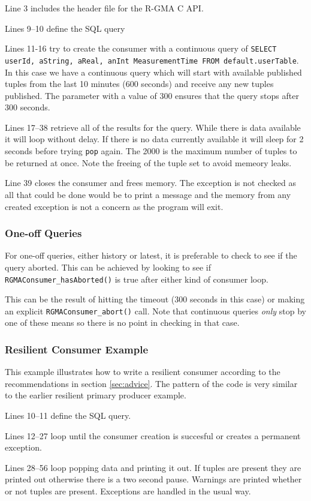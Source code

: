 Line 3 includes the header file for the R-GMA C API.

Lines 9--10 define the SQL query

Lines 11-16 try to create the consumer with a continuous query of \texttt{SELECT
userId, aString, aReal, anInt MeasurementTime FROM default.userTable}. In this case we have a
continuous query which will start with available published tuples from
the last 10 minutes (600 seconds) and receive any new tuples published. The
parameter with a value of 300 ensures that the query stops after 300 seconds.

Lines 17--38  retrieve all of the results for the query. While there is
data available it will loop without delay. If there is no data
currently available it will sleep for 2 seconds before trying
\texttt{pop} again. The 2000 is the maximum number of tuples to be
returned at once. Note the freeing of the tuple set to avoid memeory leaks.

Line 39 closes the consumer and frees memory. The exception is not checked as all
that could be done would be to print a message and the memory from any created
exception is not a concern as the program will exit.

\subsubsection {One-off Queries}
For one-off queries, either history or latest, it is preferable to
check to see if the query aborted. This can be achieved by looking to
see if \texttt{RGMAConsumer\_hasAborted()} is true after either kind of
consumer loop.

This can be the result of hitting the timeout (300 seconds in this
case) or making an explicit \texttt{RGMAConsumer\_abort()} call. Note that
continuous queries \emph{only} stop by one of these means so there is
no point in checking in that case.

\subsubsection{Resilient Consumer Example}
This example illustrates how to write a resilient consumer according
to the recommendations in section \ref{sec:advice}.
The pattern of the code is very similar to the earlier resilient primary
producer example.



Lines 10--11 define the SQL query.

Lines 12--27 loop until the consumer creation is succesful or creates a
permanent exception.

Lines 28--56 loop popping data and printing it out. If tuples are present they
are printed out otherwise there is a two second pause. Warnings are
printed whether or not tuples are present. Exceptions are handled in the usual
way.
